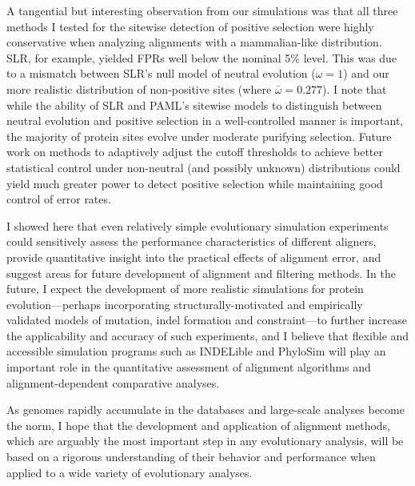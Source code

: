 A tangential but interesting observation from our simulations was that
all three methods I tested for the sitewise detection of positive
selection were highly conservative when analyzing alignments with a
mammalian-like \omg distribution. SLR, for example, yielded FPRs
well below the nominal 5\% level. This was due to a mismatch between
SLR's null model of neutral evolution ($\omega=1$) and our more
realistic distribution of non-positive sites (where
$\bar{\omega}=0.277$). I note that while the ability of SLR and PAML's
sitewise models to distinguish between neutral evolution and positive
selection in a well-controlled manner is important, the majority of
protein sites evolve under moderate purifying selection. Future work
on methods to adaptively adjust the cutoff thresholds to achieve
better statistical control under non-neutral (and possibly unknown)
\omg distributions could yield much greater power to detect positive
selection while maintaining good control of error rates.

I showed here that even relatively simple evolutionary simulation
experiments could sensitively assess the performance characteristics
of different aligners, provide quantitative insight into the practical
effects of alignment error, and suggest areas for future development
of alignment and filtering methods. In the future, I expect the
development of more realistic simulations for protein
evolution---perhaps incorporating structurally-motivated and
empirically validated models of mutation, indel formation and
constraint---to further increase the applicability and accuracy of
such experiments, and I believe that flexible and accessible
simulation programs such as INDELible \citep{Fletcher2009INDELible}
and PhyloSim \citep{Sipos2011PhyloSim} will play an important role in
the quantitative assessment of alignment algorithms and
alignment-dependent comparative analyses.

As genomes rapidly accumulate in the databases and
large-scale analyses become the norm, I hope that the development and
application of alignment methods, which are arguably the most
important step in any evolutionary analysis, will be based on a
rigorous understanding of their behavior and performance when applied
to a wide variety of evolutionary analyses.

